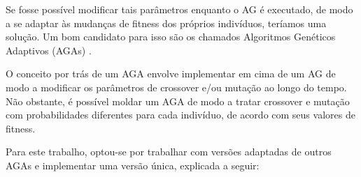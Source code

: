 Se fosse possível modificar tais parâmetros enquanto o AG é executado, de modo a se adaptar às mudanças de fitness dos próprios indivíduos, teríamos uma solução. Um bom candidato para isso são os chamados Algoritmos Genéticos Adaptivos (AGAs) \cite{srinivas1994adaptive}.

O conceito por trás de um AGA envolve implementar em cima de um AG de modo a modificar os parâmetros de crossover e/ou mutação ao longo do tempo. Não obstante, é possível moldar um AGA de modo a tratar crossover e mutação com probabilidades diferentes para cada indivíduo, de acordo com seus valores de fitness.

Para este trabalho, optou-se por trabalhar com versões adaptadas de outros AGAs \cite{jakobovic1999adaptive, wang2001improved} e implementar uma versão única, explicada a seguir:

